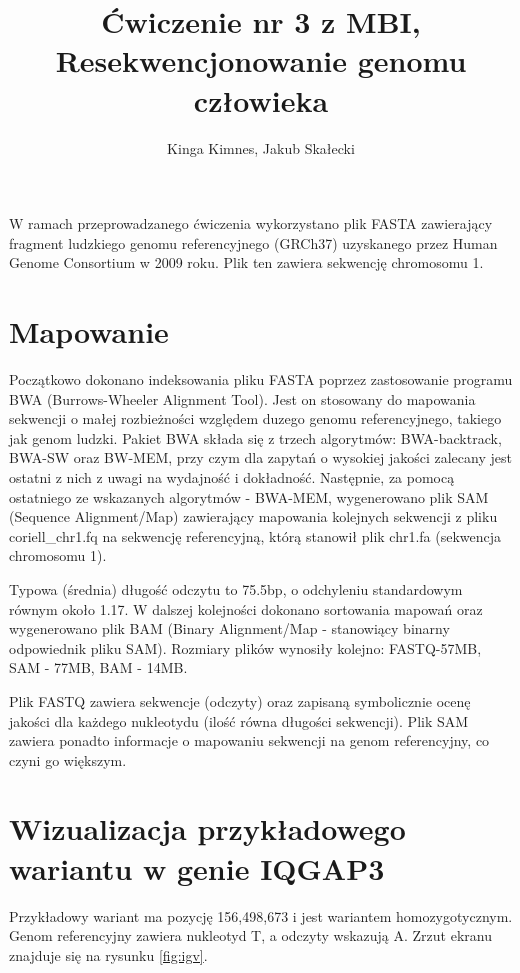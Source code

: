 \documentclass[a4paper]{article}
\begin{document}
\title{Ćwiczenie nr 3 z MBI, Resekwencjonowanie genomu człowieka}
\author{Kinga Kimnes, Jakub Skałecki}
\maketitle

W ramach przeprowadzanego ćwiczenia wykorzystano plik FASTA zawierający fragment ludzkiego genomu referencyjnego (GRCh37) uzyskanego przez Human Genome Consortium w 2009 roku. Plik ten zawiera sekwencję chromosomu 1.

\section{Mapowanie}


Początkowo dokonano indeksowania pliku FASTA poprzez zastosowanie programu BWA (Burrows-Wheeler Alignment Tool).
Jest on stosowany do mapowania sekwencji o małej rozbieżności względem duzego genomu referencyjnego, takiego jak genom ludzki.
Pakiet BWA składa się z trzech algorytmów: BWA-backtrack, BWA-SW oraz BW-MEM, przy czym dla zapytań o wysokiej jakości zalecany jest ostatni z nich z uwagi na wydajność i dokładność.
Następnie, za pomocą ostatniego ze wskazanych algorytmów - BWA-MEM, wygenerowano plik SAM (Sequence Alignment/Map) zawierający mapowania kolejnych sekwencji z pliku coriell\_chr1.fq na sekwencję referencyjną, którą stanowił plik chr1.fa (sekwencja chromosomu 1).

Typowa (średnia) długość odczytu to 75.5bp, o odchyleniu standardowym równym około 1.17.
W dalszej kolejności dokonano sortowania mapowań oraz wygenerowano plik BAM (Binary Alignment/Map - stanowiący binarny odpowiednik pliku SAM). Rozmiary plików wynosiły kolejno: FASTQ-57MB, SAM - 77MB, BAM - 14MB.

Plik FASTQ zawiera sekwencje (odczyty) oraz zapisaną symbolicznie ocenę jakości dla każdego nukleotydu (ilość równa długości sekwencji). Plik SAM zawiera ponadto informacje o mapowaniu sekwencji na genom referencyjny, co czyni go większym.

\section{Wizualizacja przykładowego wariantu w genie IQGAP3}

Przykładowy wariant ma pozycję 156,498,673 i jest wariantem homozygotycznym. Genom referencyjny zawiera nukleotyd T, a odczyty wskazują A. Zrzut ekranu znajduje się na rysunku \ref{fig:igv}.
\end{document}
